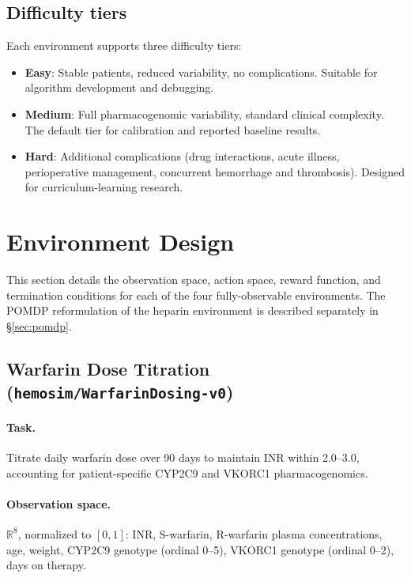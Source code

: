 \documentclass[11pt]{article}
\begin{document}
\subsection{Difficulty tiers}

Each environment supports three difficulty tiers:
\begin{itemize}
  \item \textbf{Easy}: Stable patients, reduced variability, no complications. Suitable for algorithm development and debugging.
  \item \textbf{Medium}: Full pharmacogenomic variability, standard clinical complexity. The default tier for calibration and reported baseline results.
  \item \textbf{Hard}: Additional complications (drug interactions, acute illness, perioperative management, concurrent hemorrhage and thrombosis). Designed for curriculum-learning research.
\end{itemize}

\section{Environment Design}
\label{sec:environments}

This section details the observation space, action space, reward function, and termination conditions for each of the four fully-observable environments. The POMDP reformulation of the heparin environment is described separately in \S\ref{sec:pomdp}.

\subsection{Warfarin Dose Titration (\texttt{hemosim/WarfarinDosing-v0})}

\paragraph{Task.} Titrate daily warfarin dose over 90 days to maintain INR within 2.0--3.0, accounting for patient-specific CYP2C9 and VKORC1 pharmacogenomics.

\paragraph{Observation space.} $\mathbb{R}^{8}$, normalized to $[0,1]$: INR, S-warfarin, R-warfarin plasma concentrations, age, weight, CYP2C9 genotype (ordinal 0--5), VKORC1 genotype (ordinal 0--2), days on therapy.
\end{document}
